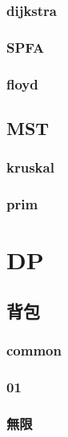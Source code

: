 \subsubsection{dijkstra}


\subsubsection{SPFA}


\subsubsection{floyd}


\subsection{MST}
\subsubsection{kruskal}


\subsubsection{prim}


\section{DP}

\subsection{背包}

\subsubsection{common}


\subsubsection{01}


\subsubsection{無限}


